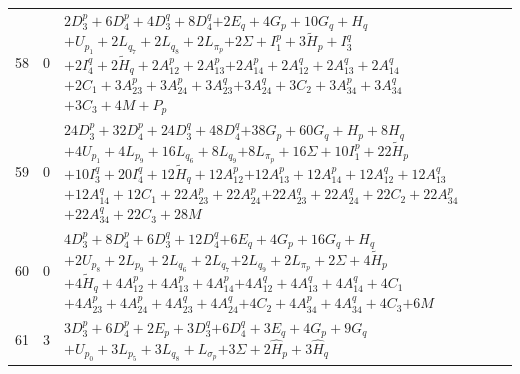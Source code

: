 \documentclass[11pt,a4paper]{article}
\theoremstyle{remark}
\begin{document}
\begin{longtable}{rrp{12.7cm}}
58&0&\( 2D_3^p + 6D_4^p + 4D_3^q + 8D_4^q \)\newline\( + 2E_q + 4G_p + 10G_q + H_q \)\newline\( + U_{p_{1}} + 2L_{q_{7}} + 2L_{q_{8}} + 2L_{\pi_p} \)\newline\( + 2\Sigma + I_1^p + 3\widetilde H_p + I_3^q \)\newline\( + 2I_4^q + 2\widetilde H_q + 2A_{12}^p + 2A_{13}^p \)\newline\( + 2A_{14}^p + 2A_{12}^q + 2A_{13}^q + 2A_{14}^q \)\newline\( + 2C_1 + 3A_{23}^p + 3A_{24}^p + 3A_{23}^q \)\newline\( + 3A_{24}^q + 3C_2 + 3A_{34}^p + 3A_{34}^q \)\newline\( + 3C_3 + 4M + P_p \)\\[3pt]
59&0&\( 24D_3^p + 32D_4^p + 24D_3^q + 48D_4^q \)\newline\( + 38G_p + 60G_q + H_p + 8H_q \)\newline\( + 4U_{p_{1}} + 4L_{p_{9}} + 16L_{q_{6}} + 8L_{q_{9}} \)\newline\( + 8L_{\pi_p} + 16\Sigma + 10I_1^p + 22\widetilde H_p \)\newline\( + 10I_3^q + 20I_4^q + 12\widetilde H_q + 12A_{12}^p \)\newline\( + 12A_{13}^p + 12A_{14}^p + 12A_{12}^q + 12A_{13}^q \)\newline\( + 12A_{14}^q + 12C_1 + 22A_{23}^p + 22A_{24}^p \)\newline\( + 22A_{23}^q + 22A_{24}^q + 22C_2 + 22A_{34}^p \)\newline\( + 22A_{34}^q + 22C_3 + 28M \)\\[3pt]
60&0&\( 4D_3^p + 8D_4^p + 6D_3^q + 12D_4^q \)\newline\( + 6E_q + 4G_p + 16G_q + H_q \)\newline\( + 2U_{p_{8}} + 2L_{p_{9}} + 2L_{q_{6}} + 2L_{q_{7}} \)\newline\( + 2L_{q_{9}} + 2L_{\pi_p} + 2\Sigma + 4\widetilde H_p \)\newline\( + 4\widetilde H_q + 4A_{12}^p + 4A_{13}^p + 4A_{14}^p \)\newline\( + 4A_{12}^q + 4A_{13}^q + 4A_{14}^q + 4C_1 \)\newline\( + 4A_{23}^p + 4A_{24}^p + 4A_{23}^q + 4A_{24}^q \)\newline\( + 4C_2 + 4A_{34}^p + 4A_{34}^q + 4C_3 \)\newline\( + 6M \)\\[3pt]
61&3&\( 3D_3^p + 6D_4^p + 2E_p + 3D_3^q \)\newline\( + 6D_4^q + 3E_q + 4G_p + 9G_q \)\newline\( + U_{p_{0}} + 3L_{p_{5}} + 3L_{q_{8}} + L_{\sigma_p} \)\newline\( + 3\Sigma + 2\widehat H_p + 3\widehat H_q \)\\[3pt]

\end{longtable}
\end{document}
